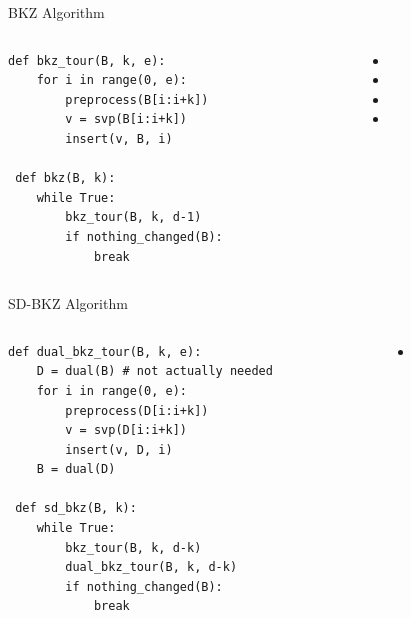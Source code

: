 \documentclass[xcolor=table,10pt,aspectratio=169]{beamer}
\begin{document}
\begin{frame}[label={sec:org8f01117},fragile]{BKZ Algorithm}
 \begin{columns}[t]
\begin{column}{0.4\columnwidth}
\lstset{language=Python,label= ,caption= ,captionpos=b,numbers=none}
\begin{lstlisting}
def bkz_tour(B, k, e):
    for i in range(0, e):
        preprocess(B[i:i+k])
        v = svp(B[i:i+k])
        insert(v, B, i)

 def bkz(B, k):
    while True:
        bkz_tour(B, k, d-1)
        if nothing_changed(B):
            break
\end{lstlisting}
\end{column}

\begin{column}{0.6\columnwidth}
\footnotesize

\begin{itemize}
\item {}
\item {}
\item {}
\item {}
\end{itemize}
\end{column}
\end{columns}
\end{frame}

\begin{frame}[label={sec:org4008084},fragile]{SD-BKZ Algorithm}
 \begin{columns}[t]
\begin{column}{0.4\columnwidth}
\lstset{language=Python,label= ,caption= ,captionpos=b,numbers=none}
\begin{lstlisting}
def dual_bkz_tour(B, k, e):
    D = dual(B) # not actually needed
    for i in range(0, e):
        preprocess(D[i:i+k])
        v = svp(D[i:i+k])
        insert(v, D, i)
    B = dual(D)

 def sd_bkz(B, k):
    while True:
        bkz_tour(B, k, d-k)
        dual_bkz_tour(B, k, d-k)
        if nothing_changed(B):
            break
\end{lstlisting}
\end{column}

\begin{column}{0.6\columnwidth}
\footnotesize

\begin{itemize}
\item {}
\end{itemize}
\end{column}
\end{columns}
\end{frame}
\end{document}
